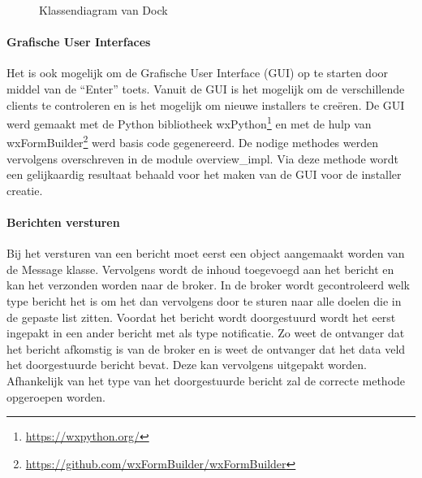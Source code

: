 \begin{figure}[!ht]
\centering
{}
\caption{Klassendiagram van Dock}
\label{fig:classDock}
\end{figure}

\paragraph{Grafische User Interfaces}
Het is ook mogelijk om de Grafische User Interface (GUI) op te starten door middel van de ``Enter'' toets.
Vanuit de GUI is het mogelijk om de verschillende clients te controleren en is het mogelijk om nieuwe installers te creëren.
De GUI werd gemaakt met de Python bibliotheek wxPython\footnote{\url{https://wxpython.org/}} en met de hulp van wxFormBuilder\footnote{\url{https://github.com/wxFormBuilder/wxFormBuilder}} werd basis code gegenereerd.
De nodige methodes werden vervolgens overschreven in de module overview\_impl.
Via deze methode wordt een gelijkaardig resultaat behaald voor het maken van de GUI voor de installer creatie.

\paragraph{Berichten versturen}
Bij het versturen van een bericht moet eerst een object aangemaakt worden van de Message klasse.
Vervolgens wordt de inhoud toegevoegd aan het bericht en kan het verzonden worden naar de broker.
In de broker wordt gecontroleerd welk type bericht het is om het dan vervolgens door te sturen naar alle doelen die in de gepaste list zitten.
Voordat het bericht wordt doorgestuurd wordt het eerst ingepakt in een ander bericht met als type notificatie.
Zo weet de ontvanger dat het bericht afkomstig is van de broker en is weet de ontvanger dat het data veld het doorgestuurde bericht bevat.
Deze kan vervolgens uitgepakt worden.
Afhankelijk van het type van het doorgestuurde bericht zal de correcte methode opgeroepen worden.

